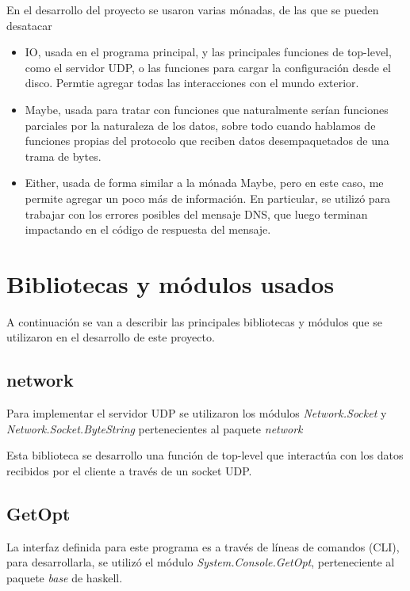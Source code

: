 \documentclass[6pt]{article}
\begin{document}
En el desarrollo del proyecto se usaron varias mónadas, de las que se
pueden desatacar

\begin{itemize}
  \item IO, usada en el programa principal, y las principales funciones
  de top-level, como el servidor UDP, o las funciones para cargar la
  configuración desde el disco. Permtie agregar todas las interacciones
  con el mundo exterior.
  \item Maybe, usada para tratar con funciones que naturalmente serían
  funciones parciales por la naturaleza de los datos, sobre todo cuando
  hablamos de funciones propias del protocolo que reciben datos
  desempaquetados de una trama de bytes.
  \item Either, usada de forma similar a la mónada Maybe, pero en este
  caso, me permite agregar un poco más de información. En particular,
  se utilizó para trabajar con los errores posibles del mensaje DNS, que
  luego terminan impactando en el código de respuesta del mensaje.
\end{itemize}

\section{Bibliotecas y módulos usados}

A continuación se van a describir las principales bibliotecas y módulos que se
utilizaron en el desarrollo de este proyecto.

\subsection{network \cite{package-network-socket}}

Para implementar el servidor UDP se utilizaron los módulos \textit{Network.Socket}
y \textit{Network.Socket.ByteString} pertenecientes al paquete \textit{network}

Esta biblioteca se desarrollo una función de top-level que interactúa con
los datos recibidos por el cliente a través de un socket UDP.

\subsection{GetOpt \cite{package-get-opt}}

La interfaz definida para este programa es a través de líneas
de comandos (CLI), para desarrollarla, se utilizó el módulo
\textit{System.Console.GetOpt}, perteneciente al paquete
\textit{base} de haskell.
\end{document}
